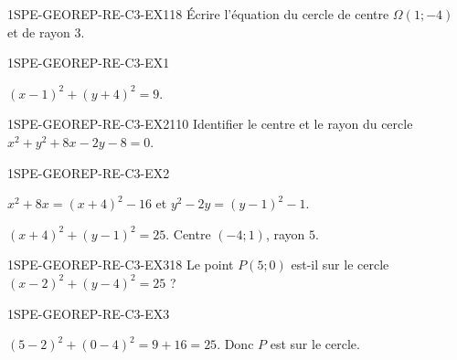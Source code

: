 

\begin{exercice}{1SPE-GEOREP-RE-C3-EX1}{1}{8}
Écrire l'équation du cercle de centre $\Omega(1 ; -4)$ et de rayon $3$.
\end{exercice}


\begin{corrige}{1SPE-GEOREP-RE-C3-EX1}

$(x - 1)^2 + (y + 4)^2 = 9$.

\end{corrige}

\begin{exercice}{1SPE-GEOREP-RE-C3-EX2}{1}{10}
Identifier le centre et le rayon du cercle $x^2 + y^2 + 8x - 2y - 8 = 0$.
\end{exercice}



\begin{corrige}{1SPE-GEOREP-RE-C3-EX2}

$x^2 + 8x = (x+4)^2 - 16$ et $y^2 - 2y = (y-1)^2 - 1$.

$(x+4)^2 + (y-1)^2 = 25$. Centre $(-4 ; 1)$, rayon $5$.

\end{corrige}

\begin{exercice}{1SPE-GEOREP-RE-C3-EX3}{1}{8}
Le point $P(5 ; 0)$ est-il sur le cercle $(x - 2)^2 + (y - 4)^2 = 25$ ?
\end{exercice}


\begin{corrige}{1SPE-GEOREP-RE-C3-EX3}

$(5 - 2)^2 + (0 - 4)^2 = 9 + 16 = 25$. Donc $P$ est sur le cercle.

\end{corrige}
